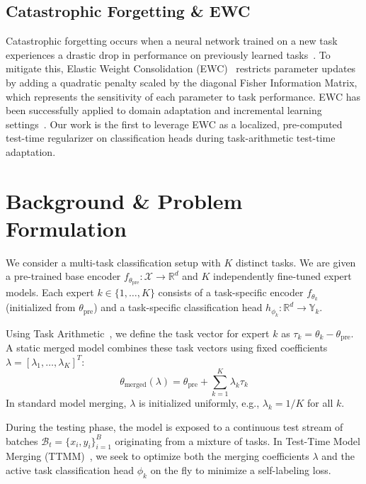 \documentclass{article}
\theoremstyle{plain}
\theoremstyle{definition}
\theoremstyle{remark}
\begin{document}
\subsection{Catastrophic Forgetting \& EWC}
Catastrophic forgetting occurs when a neural network trained on a new task experiences a drastic drop in performance on previously learned tasks~\citep{kirkpatrick2017overcoming}. To mitigate this, Elastic Weight Consolidation (EWC)~\citep{kirkpatrick2017overcoming} restricts parameter updates by adding a quadratic penalty scaled by the diagonal Fisher Information Matrix, which represents the sensitivity of each parameter to task performance. EWC has been successfully applied to domain adaptation and incremental learning settings~\citep{sabaaslam2024cel, zhengranhe2025robust, wenjinxue2025enhancing, enginbaysal2025overcoming}. Our work is the first to leverage EWC as a localized, pre-computed test-time regularizer on classification heads during task-arithmetic test-time adaptation.

\section{Background \& Problem Formulation}
\label{submission-background}

We consider a multi-task classification setup with $K$ distinct tasks. We are given a pre-trained base encoder $f_{\theta_{\text{pre}}}: \mathcal{X} \rightarrow \mathbb{R}^d$ and $K$ independently fine-tuned expert models. Each expert $k \in \{1, \dots, K\}$ consists of a task-specific encoder $f_{\theta_k}$ (initialized from $\theta_{\text{pre}}$) and a task-specific classification head $h_{\phi_k}: \mathbb{R}^d \rightarrow \mathbb{Y}_k$.

Using Task Arithmetic~\citep{ilharco2022editing}, we define the task vector for expert $k$ as $\tau_k = \theta_k - \theta_{\text{pre}}$. A static merged model combines these task vectors using fixed coefficients $\lambda = [\lambda_1, \dots, \lambda_K]^T$:
\begin{equation}
    \theta_{\text{merged}}(\lambda) = \theta_{\text{pre}} + \sum_{k=1}^K \lambda_k \tau_k
\end{equation}
In standard model merging, $\lambda$ is initialized uniformly, e.g., $\lambda_k = 1/K$ for all $k$.

During the testing phase, the model is exposed to a continuous test stream of batches $\mathcal{B}_t = \{x_i, y_i\}_{i=1}^B$ originating from a mixture of tasks. In Test-Time Model Merging (TTMM)~\citep{zhao2024test}, we seek to optimize both the merging coefficients $\lambda$ and the active task classification head $\phi_k$ on the fly to minimize a self-labeling loss. 
\end{document}
